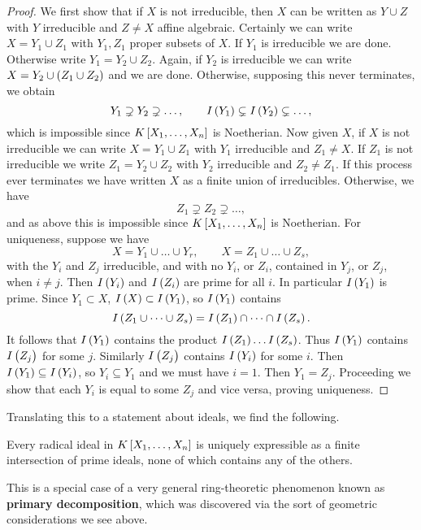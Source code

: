 \begin{proof}
We first show that if $ X $ is not irreducible, then $ X $ can be written as $ Y \cup Z $ with $ Y $ irreducible and $ Z \ne X $ affine algebraic. Certainly we can write $ X = Y_1 \cup Z_1 $ with $ Y_1, Z_1 $ proper subsets of $ X $. If $ Y_1 $ is irreducible we are done. Otherwise write $ Y_1 = Y_2 \cup Z_2 $. Again, if $ Y_2 $ is irreducible we can write $ X = Y_2 \cup \br{Z_1 \cup Z_2} $ and we are done. Otherwise, supposing this never terminates, we obtain
$$ Y_1 \supsetneq Y_2 \supsetneq \dots, \qquad I\br{Y_1} \subsetneq I\br{Y_2} \subsetneq \dots, $$
which is impossible since $ K\sbr{X_1, \dots, X_n} $ is Noetherian. Now given $ X $, if $ X $ is not irreducible we can write $ X = Y_1 \cup Z_1 $ with $ Y_1 $ irreducible and $ Z_1 \ne X $. If $ Z_1 $ is not irreducible we write $ Z_1 = Y_2 \cup Z_2 $ with $ Y_2 $ irreducible and $ Z_2 \ne Z_1 $. If this process ever terminates we have written $ X $ as a finite union of irreducibles. Otherwise, we have
$$ Z_1 \supsetneq Z_2 \supsetneq \dots, $$
and as above this is impossible since $ K\sbr{X_1, \dots, X_n} $ is Noetherian. For uniqueness, suppose we have
$$ X = Y_1 \cup \dots \cup Y_r, \qquad X = Z_1 \cup \dots \cup Z_s, $$
with the $ Y_i $ and $ Z_j $ irreducible, and with no $ Y_i $, or $ Z_i $, contained in $ Y_j $, or $ Z_j $, when $ i \ne j $. Then $ I\br{Y_i} $ and $ I\br{Z_i} $ are prime for all $ i $. In particular $ I\br{Y_1} $ is prime. Since $ Y_1 \subset X $, $ I\br{X} \subset I\br{Y_1} $, so $ I\br{Y_1} $ contains
$$ I\br{Z_1 \cup \dots \cup Z_s} = I\br{Z_1} \cap \dots \cap I\br{Z_s}. $$
It follows that $ I\br{Y_1} $ contains the product $ I\br{Z_1} \dots I\br{Z_s} $. Thus $ I\br{Y_1} $ contains $ I\br{Z_j} $ for some $ j $. Similarly $ I\br{Z_j} $ contains $ I\br{Y_i} $ for some $ i $. Then $ I\br{Y_1} \subseteq I\br{Y_i} $, so $ Y_i \subseteq Y_1 $ and we must have $ i = 1 $. Then $ Y_1 = Z_j $. Proceeding we show that each $ Y_i $ is equal to some $ Z_j $ and vice versa, proving uniqueness.
\end{proof}

Translating this to a statement about ideals, we find the following.

\begin{corollary}
Every radical ideal in $ K\sbr{X_1, \dots, X_n} $ is uniquely expressible as a finite intersection of prime ideals, none of which contains any of the others.
\end{corollary}

This is a special case of a very general ring-theoretic phenomenon known as \textbf{primary decomposition}, which was discovered via the sort of geometric considerations we see above.

